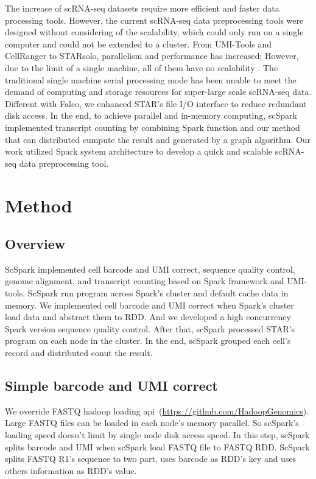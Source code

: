 \documentclass[conference]{IEEEtran}
\begin{document}
The increase of scRNA-seq datasets require more efficient and faster data processing tools. However, the current scRNA-seq data preprocessing tools were designed without considering of the scalability, which could only run on a single computer and could not be extended to a cluster. From UMI-Tools and CellRanger to STARsolo, parallelism and performance has increased; However, due to the limit of a single machine, all of them have no scalability . 
The traditional single machine serial processing mode has been unable to meet the demand of computing and storage resources for super-large scale scRNA-seq data.
Different with Falco, we enhanced STAR's file I/O interface to reduce redundant disk access.
In the end, to achieve parallel and in-memory computing, scSpark implemented transcript counting by combining Spark function and our method that can distributed cumpute the result and generated by a graph algorithm.
Our work utilized Spark system architecture to develop a quick and scalable scRNA-seq data preprocessing tool. 

\section{Method}
\subsection{Overview}
ScSpark implemented cell barcode and UMI correct, sequence quality control, genome alignment, and transcript counting based on Spark framework and UMI-tools.
ScSpark run program across Spark's cluster and default cache data in memory. 
We implemented cell barcode and UMI correct when Spark's cluster load data and abstract them to RDD.
And we developed a high concurrency Spark version sequence quality control. 
After that, scSpark processed STAR's program on each node in the cluster.
In the end, scSpark grouped each cell's record and distributed conut the result.

\subsection{Simple barcode and UMI correct}
We override FASTQ hadoop loading api~(\url{https://github.com/HadoopGenomics}).
Large FASTQ files can be loaded in each node's memory parallel.
So scSpark's loading speed doesn't limit by single node disk access speed.
In this step, scSpark splits barcode and UMI when scSpark load FASTQ file to FASTQ RDD.
ScSpark splits FASTQ R1's sequence to two part, uses barcode as RDD's key and uses others information as RDD's value.
\end{document}
